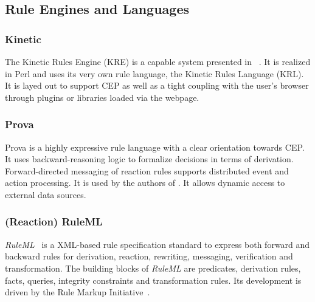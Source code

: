 \documentclass[11pt]{article}%
\begin{document}
\subsection{Rule Engines and Languages}

\subsubsection{Kinetic}
The Kinetic Rules Engine (KRE) is a capable system presented in ~\cite{bookTheLiveWeb}. It is realized in Perl and uses its very own rule language, the Kinetic Rules Language (KRL). It is layed out to support CEP as well as a tight coupling with the user's browser through plugins or libraries loaded via the webpage. 






\subsubsection{Prova}
Prova is a highly expressive rule language with a clear orientation towards CEP. It uses backward-reasoning logic to formalize decisions in terms of derivation. Forward-directed messaging of reaction rules supports distributed event and action processing. It is used by the authors of \cite{2013_Zhao-Paschke_EDSWE.pdf,2007-Paschke_etal-RuleResponder.pdf}. It allows dynamic access to external data sources.


\subsubsection{(Reaction) RuleML}
\textit{RuleML}~\cite{2006-Boley-RuleML.pdf} is a XML-based rule specification standard to express both forward and backward rules for derivation, reaction, rewriting, messaging, verification and transformation. The building blocks of \textit{RuleML} are predicates, derivation rules, facts, queries, integrity constraints and transformation rules. Its development is driven by the Rule Markup Initiative~\cite{wwwruleml}.
\end{document}
